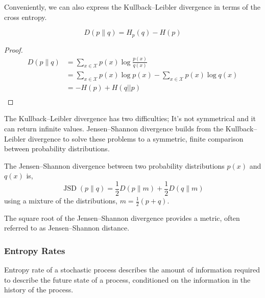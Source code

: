 Conveniently, we can also express the Kullback–Leibler divergence in terms of the cross entropy.
\begin{lemma}
		\begin{equation}
		D(p \| q) = H_p(q) - H(p) 
		\end{equation}
\end{lemma}
\begin{proof}
	\begin{align}
		D(p \| q) &=\sum_{x \in \mathcal{X}} p(x) \log \frac{p(x)}{q(x)} \\
		 &= \sum_{x \in \mathcal{X}} p(x) \log p(x)    -     \sum_{x \in \mathcal{X}} p(x) \log q(x)\\
		 &= -H(p)   +    H(q||p)\\
	\end{align}
\end{proof}

The Kullback–Leibler divergence has two difficulties; It's not symmetrical and it can return infinite values. Jensen–Shannon divergence builds from the Kullback–Leibler divergence to solve these problems to a symmetric, finite comparison between probability distributions. 

\begin{definition}
 The Jensen–Shannon divergence between two probability distributions $p(x)$ and $q(x)$ is,
	\begin{equation}
	\operatorname{JSD}(p \| q)=\frac{1}{2} D(p \| m)+\frac{1}{2} D(q \| m)
	\end{equation}
	using a mixture of the distributions, 	$m=\frac{1}{2}(p+q)$.
\end{definition}


\begin{remark}
	The square root of the Jensen–Shannon divergence provides a metric, often referred to as Jensen–Shannon distance.
\end{remark}







\subsubsection{Entropy Rates}

Entropy rate of a stochastic process describes the amount of information required to describe the future state of a process, conditioned on the information in the history of the process.

